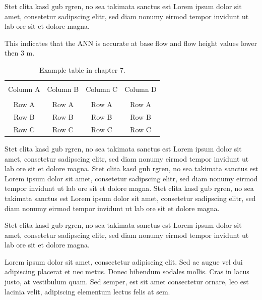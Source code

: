 Stet clita kasd gub rgren, no sea takimata sanctus est Lorem ipsum dolor sit amet, consetetur sadipscing elitr, sed diam nonumy eirmod tempor invidunt ut lab ore sit et dolore magna.

This indicates that the ANN is accurate at base flow and flow height values lower then 3 m. 

\begin{table}[!htbp]
	{\setlength{\tabcolsep}{14pt}
		\caption{Example table in chapter 7.}
		\begin{center}
			\vspace{-6mm}
			\begin{tabular}{cccc}
				\hline \\[-2.45ex] \hline \\[-2.1ex]
				Column A & Column B & Column C & Column D \\
				\hline \\[-1.8ex]
				Row A & Row A & Row A & Row A \\
				Row B & Row B & Row B & Row B \\
				Row C & Row C & Row C & Row C \\
				[-0ex] \hline
			\end{tabular}
			\vspace{-6mm}
		\end{center}
		\label{Table7.1}}
\end{table}

Stet clita kasd gub rgren, no sea takimata sanctus est Lorem ipsum dolor sit amet, consetetur sadipscing elitr, sed diam nonumy eirmod tempor invidunt ut lab ore sit et dolore magna. Stet clita kasd gub rgren, no sea takimata sanctus est Lorem ipsum dolor sit amet, consetetur sadipscing elitr, sed diam nonumy eirmod tempor invidunt ut lab ore sit et dolore magna. Stet clita kasd gub rgren, no sea takimata sanctus est Lorem ipsum dolor sit amet, consetetur sadipscing elitr, sed diam nonumy eirmod tempor invidunt ut lab ore sit et dolore magna. 

Stet clita kasd gub rgren, no sea takimata sanctus est Lorem ipsum dolor sit amet, consetetur sadipscing elitr, sed diam nonumy eirmod tempor invidunt ut lab ore sit et dolore magna. 


Lorem ipsum dolor sit amet, consectetur adipiscing elit. Sed ac augue vel dui adipiscing placerat et nec metus. Donec bibendum sodales mollis. Cras in lacus justo, at vestibulum quam. Sed semper, est sit amet consectetur ornare, leo est lacinia velit, adipiscing elementum lectus felis at sem.

